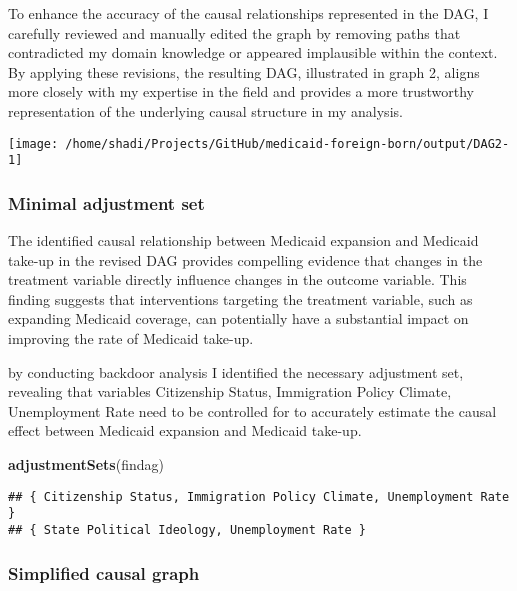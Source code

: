 \documentclass[
]{article}
\newenvironment{Shaded}{\begin{snugshade}}{\end{snugshade}}
\newcommand{\FunctionTok}[1]{\textcolor[rgb]{0.13,0.29,0.53}{\textbf{#1}}}
\newcommand{\NormalTok}[1]{#1}
\begin{document}
To enhance the accuracy of the causal relationships represented in the
DAG, I carefully reviewed and manually edited the graph by removing
paths that contradicted my domain knowledge or appeared implausible
within the context. By applying these revisions, the resulting DAG,
illustrated in graph 2, aligns more closely with my expertise in the
field and provides a more trustworthy representation of the underlying
causal structure in my analysis.

\begin{center}\texttt{[image: /home/shadi/Projects/GitHub/medicaid-foreign-born/output/DAG2-1]} \end{center}

\hypertarget{minimal-adjustment-set}{%
\subsubsection{Minimal adjustment set}\label{minimal-adjustment-set}}

The identified causal relationship between Medicaid expansion and
Medicaid take-up in the revised DAG provides compelling evidence that
changes in the treatment variable directly influence changes in the
outcome variable. This finding suggests that interventions targeting the
treatment variable, such as expanding Medicaid coverage, can potentially
have a substantial impact on improving the rate of Medicaid take-up.

by conducting backdoor analysis I identified the necessary adjustment
set, revealing that variables Citizenship Status, Immigration Policy
Climate, Unemployment Rate need to be controlled for to accurately
estimate the causal effect between Medicaid expansion and Medicaid
take-up.

\begin{Shaded}
\begin{Highlighting}[]
\FunctionTok{adjustmentSets}\NormalTok{(findag)}
\end{Highlighting}
\end{Shaded}

\begin{verbatim}
## { Citizenship Status, Immigration Policy Climate, Unemployment Rate }
## { State Political Ideology, Unemployment Rate }
\end{verbatim}

\hypertarget{simplified-causal-graph}{%
\subsubsection{Simplified causal graph}\label{simplified-causal-graph}}
\end{document}
